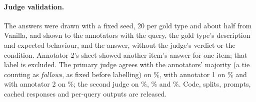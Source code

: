 \paragraph{Judge validation.} The \nvalid answers were drawn with a fixed seed, 20 per gold type and about half from
Vanilla, and shown to the annotators with the query, the gold type's description and expected behaviour, and the
answer, without the judge's verdict or the condition. Annotator 2's sheet showed another item's answer for one item;
that label is excluded. The primary judge agrees with the annotators' majority (a tie counting as \emph{follows},
as fixed before labelling) on \eevalacc\%, with annotator 1 on \eevalaccone\% and with annotator 2 on
\eevalacctwo\%; the second judge on \fbvalacc\%, \fbvalaccone\% and \fbvalacctwo\%. Code,
splits, prompts, cached responses and per-query outputs are released.
